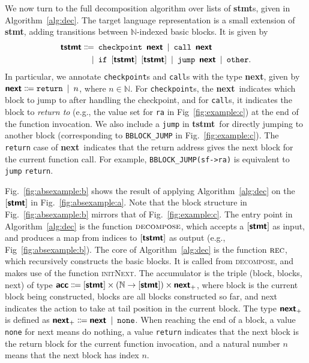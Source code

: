 \documentclass[runningheads]{llncs}
\newcommand{\rlstinline}{\lstinline[language=RootPPL]}
\newcommand{\ttt}{\texttt}
\newcommand{\stmt}{\textbf{\textsf{stmt}}}
\newcommand{\tstmt}{\textbf{\textsf{tstmt}}}
\newcommand{\nextty}{\textbf{\textsf{next}}}
\newcommand{\accty}{\textbf{\textsf{acc}}}
\begin{document}
We now turn to the full decomposition algorithm over lists of \stmt s, given in Algorithm~\ref{alg:dec}.
The target language representation is a small extension of \stmt, adding transitions between $\mathbb{N}$-indexed basic blocks.
It is given by
\begin{equation}\label{eq:stmtsplus}
  \begin{aligned}
    \tstmt \Coloneqq& \enspace
    \texttt{checkpoint} \enspace \nextty
    \enspace | \enspace
    \texttt{call} \enspace \nextty
    \\ |& \enspace
    \texttt{if} \enspace
    [\tstmt] \enspace
    [\tstmt]
    \enspace | \enspace
    \texttt{jump} \enspace \nextty
    \enspace | \enspace
    \texttt{other}.
  \end{aligned}
\end{equation}
In particular, we annotate \ttt{checkpoint}s and \ttt{call}s with the type \nextty, given by $\nextty \Coloneqq \texttt{return} \enspace | \enspace n$, where $n \in \mathbb{N}$.
For \ttt{checkpoint}s, the \nextty\ indicates which block to jump to after handling the checkpoint, and for \ttt{call}s, it indicates the block to \emph{return to} (e.g., the value set for \rlstinline!ra! in Fig~\ref{fig:example:c}) at the end of the function invocation.
We also include a \ttt{jump} in \tstmt\ for directly jumping to another block (corresponding to \rlstinline!BBLOCK_JUMP! in Fig.~\ref{fig:example:c}).
The \ttt{return} case of \nextty\ indicates that the return address gives the next block for the current function call.
For example, \rlstinline!BBLOCK_JUMP(sf->ra)! is equivalent to \ttt{jump} \ttt{return}.

Fig.~\ref{fig:absexample:b} shows the result of applying Algorithm~\ref{alg:dec} on the $[\stmt]$ in Fig.~\ref{fig:absexample:a}.
Note that the block structure in Fig.~\ref{fig:absexample:b} mirrors that of Fig.~\ref{fig:example:c}.
The entry point in Algorithm~\ref{alg:dec} is the function $\textsc{decompose}$, which accepts a $[\stmt]$ as input, and produces a map from indices to $[\tstmt]$ as output (e.g., Fig~\ref{fig:absexample:b}).
The core of Algorithm~\ref{alg:dec} is the function $\textsc{rec}$, which recursively constructs the basic blocks.
It is called from \textsc{decompose}, and makes use of the function \textsc{initNext}.
The accumulator is the triple \textsf{(block, blocks, next)} of type $\accty \Coloneqq [\stmt] \times (\mathbb{N} \rightarrow [\stmt]) \times \nextty_+$, where \textsf{block} is the current block being constructed, \textsf{blocks} are all blocks constructed so far, and \textsf{next} indicates the action to take at tail position in the current block.
The type $\nextty_+$ is defined as $\nextty_+ \Coloneqq \nextty \enspace | \enspace \texttt{none}$.
When reaching the end of a block, a value \texttt{none} for next means do nothing, a value \texttt{return} indicates that the next block is the return block for the current function invocation, and a natural number $n$ means that the next block has index $n$.
\end{document}
